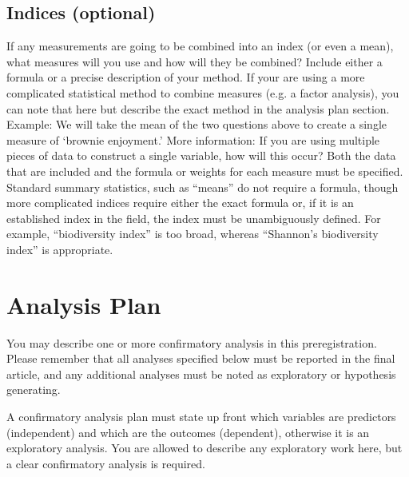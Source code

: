 \documentclass[
10pt, %
a4paper, %
oneside, %
headinclude,footinclude, %
BCOR5mm, %
]{scrartcl}
\begin{document}
\subsection{Indices (optional)}
If any measurements are  going to be combined into an index (or even a mean), what measures will you use and how will they be combined? Include either a formula or a precise description of your method. If your are using a more complicated statistical method to combine measures (e.g. a factor analysis), you can note that here but describe the exact method in the analysis plan section.
Example: We will take the mean of the two questions above to create a single measure of ‘brownie enjoyment.’ 
More information: If you are using multiple pieces of data to construct a single variable, how will this occur? Both the data that are included and the formula or weights for each measure must be specified. Standard summary statistics, such as “means” do not require a formula, though more complicated indices require either the exact formula or, if it is an established index in the field, the index must be unambiguously defined. For example, “biodiversity index” is too broad, whereas “Shannon’s biodiversity index” is appropriate.



\section{Analysis Plan}

You may describe one or more confirmatory analysis in this preregistration. Please remember that all analyses specified below must be reported in the final article, and any additional analyses must be noted as exploratory or hypothesis generating.

A confirmatory analysis plan must state up front which variables are predictors (independent) and which are the outcomes (dependent), otherwise it is an exploratory analysis. You are allowed to describe any exploratory work here, but a clear confirmatory analysis is required. 
 
\end{document}
